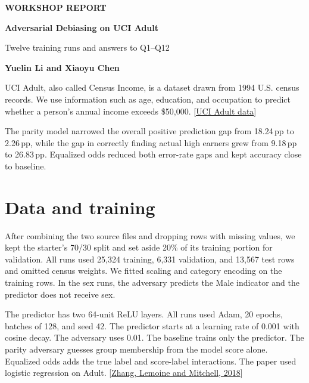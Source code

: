 \documentclass[11pt,letterpaper]{article}
\newcommand{\gap}[1]{#1\,pp}
\begin{document}
{\small\sffamily\bfseries\color{accent}WORKSHOP REPORT\par}
\vspace{2pt}
{\fontsize{27}{30}\selectfont\sffamily\bfseries\color{ink}
Adversarial Debiasing on UCI Adult\par}
\vspace{3pt}
{\large\color{muted}Twelve training runs and answers to Q1--Q12\par}
\vspace{3pt}
{\normalsize\sffamily\bfseries\color{ink}Yuelin Li and Xiaoyu Chen\par}
\vspace{3pt}

UCI Adult, also called Census Income, is a dataset drawn from 1994 U.S. census records. We use information such as age, education, and occupation to predict whether a person's annual income exceeds \$50,000. [\href{https://archive.ics.uci.edu/dataset/2/adult}{UCI Adult data}]

The parity model narrowed the overall positive prediction gap from \gap{18.24} to \gap{2.26}, while the gap in correctly finding actual high earners grew from \gap{9.18} to \gap{26.83}. Equalized odds reduced both error-rate gaps and kept accuracy close to baseline.

\section*{Data and training}

After combining the two source files and dropping rows with missing values, we kept the starter's 70/30 split and set aside 20\% of its training portion for validation. All runs used 25,324 training, 6,331 validation, and 13,567 test rows and omitted census weights. We fitted scaling and category encoding on the training rows. In the sex runs, the adversary predicts the Male indicator and the predictor does not receive sex.

The predictor has two 64-unit ReLU layers. All runs used Adam, 20 epochs, batches of 128, and seed 42. The predictor starts at a learning rate of 0.001 with cosine decay. The adversary uses 0.01. The baseline trains only the predictor. The parity adversary guesses group membership from the model score alone. Equalized odds adds the true label and score-label interactions. The paper used logistic regression on Adult. [\href{https://www.aies-conference.com/2018/contents/papers/main/AIES_2018_paper_162.pdf}{Zhang, Lemoine and Mitchell, 2018}]
\end{document}
